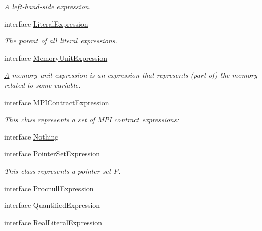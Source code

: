\begin{DoxyCompactItemize}
\begin{DoxyCompactList}\small\item\em \hyperlink{structA}{A} left-\/hand-\/side expression. \end{DoxyCompactList}\item 
interface \hyperlink{interfaceedu_1_1udel_1_1cis_1_1vsl_1_1civl_1_1model_1_1IF_1_1expression_1_1LiteralExpression}{Literal\+Expression}
\begin{DoxyCompactList}\small\item\em The parent of all literal expressions. \end{DoxyCompactList}\item 
interface \hyperlink{interfaceedu_1_1udel_1_1cis_1_1vsl_1_1civl_1_1model_1_1IF_1_1expression_1_1MemoryUnitExpression}{Memory\+Unit\+Expression}
\begin{DoxyCompactList}\small\item\em \hyperlink{structA}{A} memory unit expression is an expression that represents (part of) the memory related to some variable. \end{DoxyCompactList}\item 
interface \hyperlink{interfaceedu_1_1udel_1_1cis_1_1vsl_1_1civl_1_1model_1_1IF_1_1expression_1_1MPIContractExpression}{M\+P\+I\+Contract\+Expression}
\begin{DoxyCompactList}\small\item\em This class represents a set of M\+P\+I contract expressions\+: \end{DoxyCompactList}\item 
interface \hyperlink{interfaceedu_1_1udel_1_1cis_1_1vsl_1_1civl_1_1model_1_1IF_1_1expression_1_1Nothing}{Nothing}
\item 
interface \hyperlink{interfaceedu_1_1udel_1_1cis_1_1vsl_1_1civl_1_1model_1_1IF_1_1expression_1_1PointerSetExpression}{Pointer\+Set\+Expression}
\begin{DoxyCompactList}\small\item\em This class represents a pointer set P. \end{DoxyCompactList}\item 
interface \hyperlink{interfaceedu_1_1udel_1_1cis_1_1vsl_1_1civl_1_1model_1_1IF_1_1expression_1_1ProcnullExpression}{Procnull\+Expression}
\item 
interface \hyperlink{interfaceedu_1_1udel_1_1cis_1_1vsl_1_1civl_1_1model_1_1IF_1_1expression_1_1QuantifiedExpression}{Quantified\+Expression}
\item 
interface \hyperlink{interfaceedu_1_1udel_1_1cis_1_1vsl_1_1civl_1_1model_1_1IF_1_1expression_1_1RealLiteralExpression}{Real\+Literal\+Expression}

\end{DoxyCompactItemize}
